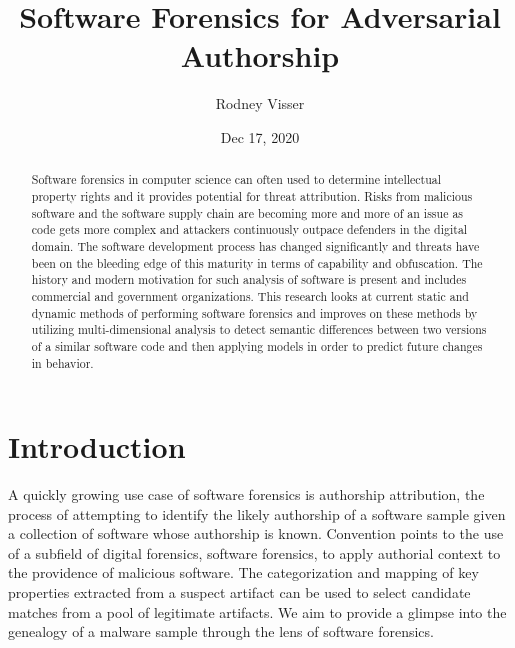 \documentclass[12pt]{report}
\title{Software Forensics for Adversarial Authorship}
\author{Rodney Visser}
\date{Dec 17, 2020} %
\begin{document}
\begin{romanpages}      %
\TitlePage 

\begin{abstract} 
Software forensics in computer science can often used to determine intellectual property rights and it provides potential for threat attribution.  Risks from malicious software and the software supply chain are becoming more and more of an issue as code gets more complex and attackers continuously outpace defenders in the digital domain.  The software development process has changed significantly and threats have been on the bleeding edge of this maturity in terms of capability and obfuscation. The history and modern motivation for such analysis of software is present and includes commercial and government organizations.  This research looks at current static and dynamic methods of performing software forensics and improves on these methods by utilizing multi-dimensional analysis to detect semantic differences between two versions of a similar software code and then applying models in order to predict future changes in behavior.
\end{abstract}


\tableofcontents
\listoffigures

\printnomenclature[0.5in] %
\end{romanpages}        %


\normalem       %
\chapter{Introduction}  
\label{chap:one}

A quickly growing use case of software forensics is authorship attribution, the process of attempting to identify the likely authorship of a software sample given a collection of software whose authorship is known.  Convention points to the use of a subfield of digital forensics, software forensics,  to apply authorial context to the providence of malicious software.  The categorization and mapping of key properties extracted from a suspect artifact can be used to select candidate matches from a pool of legitimate artifacts.  We aim to provide a glimpse into the genealogy of a malware sample through the lens of software forensics.
\end{document}
